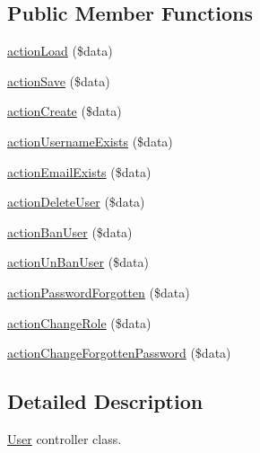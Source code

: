 \subsection*{Public Member Functions}
\begin{DoxyCompactItemize}
\item 
\hyperlink{classUserController_a7295cd724ff78bf67971bc98423405e0}{actionLoad} (\$data)
\item 
\hyperlink{classUserController_aa2eeb49ff1dbd448a986e97a72179fb5}{actionSave} (\$data)
\item 
\hyperlink{classUserController_a76cd84168a31f120db7c870d122f2270}{actionCreate} (\$data)
\item 
\hyperlink{classUserController_a68423799af006a035af5f5a7dc466166}{actionUsernameExists} (\$data)
\item 
\hyperlink{classUserController_a6a6bb3ce82990762f17460bf6b57595f}{actionEmailExists} (\$data)
\item 
\hyperlink{classUserController_af0a863a6fb8e1abb0e5830bb787c580c}{actionDeleteUser} (\$data)
\item 
\hyperlink{classUserController_a3e41d7a8100c0a094330227a872b100a}{actionBanUser} (\$data)
\item 
\hyperlink{classUserController_a4506a9975c5185621d76a163c514dbd9}{actionUnBanUser} (\$data)
\item 
\hyperlink{classUserController_a871a1c07ec9fc14a41a57d1e6268aa6d}{actionPasswordForgotten} (\$data)
\item 
\hyperlink{classUserController_ab1b1338f5cbaaaa66a8f8e2f56029b14}{actionChangeRole} (\$data)
\item 
\hyperlink{classUserController_ad0a71c9656f67576fc07b7b58b94640e}{actionChangeForgottenPassword} (\$data)
\end{DoxyCompactItemize}


\subsection{Detailed Description}
\hyperlink{classUser}{User} controller class. 

